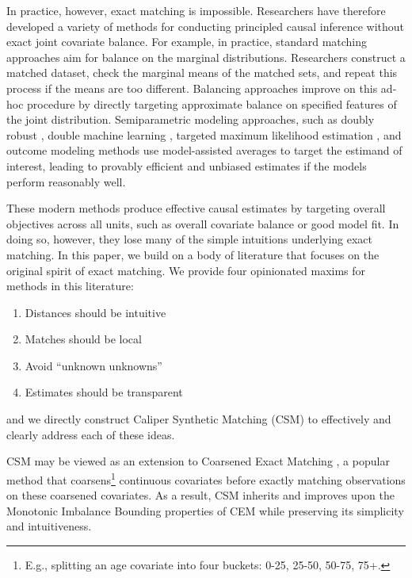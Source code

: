 \documentclass{article}
\begin{document}
In practice, however, exact matching is impossible.
Researchers have therefore developed a variety of methods for conducting principled causal inference without exact joint covariate balance.
For example, in practice, standard matching approaches aim for balance on the marginal distributions.
Researchers construct a matched dataset, check the marginal means of the matched sets, and repeat this process if the means are too different.
Balancing approaches \citep[e.g., ][]{hainmueller2012entropy, zubizarreta2015stable, ben2021balancing} improve on this ad-hoc procedure by directly targeting approximate balance on specified features of the joint distribution.
Semiparametric modeling approaches, such as doubly robust \citep{robins1994estimation, rotnitzky1998semiparametric}, double machine learning \citep{chernozhukov2018dml}, targeted maximum likelihood estimation \citep{van2006targeted}, and outcome modeling methods \citep[e.g., ][]{hill2011bayesian} use model-assisted averages to target the estimand of interest, leading to provably efficient and unbiased estimates if the models perform reasonably well.

These modern methods produce effective causal estimates by targeting overall objectives across all units, such as overall covariate balance or good model fit.
In doing so, however, they lose many of the simple intuitions underlying exact matching.
In this paper, we build on a body of literature that focuses on the original spirit of exact matching.
We provide four opinionated maxims for methods in this literature: 
\begin{enumerate}[itemsep=0pt, topsep=12pt, partopsep=0pt]
    \item Distances should be intuitive
    \item Matches should be local
    \item Avoid ``unknown unknowns''
    \item Estimates should be transparent
\end{enumerate}
and we directly construct Caliper Synthetic Matching (CSM) to effectively and clearly address each of these ideas.

CSM may be viewed as an extension to Coarsened Exact Matching \citep[CEM; ][]{iacus2012causal}, a popular method that coarsens\footnote{E.g., splitting an age covariate into four buckets: 0-25, 25-50, 50-75, 75+.} continuous covariates before exactly matching observations on these coarsened covariates.
As a result, CSM inherits and improves upon the Monotonic Imbalance Bounding \citep[MIB; ][]{iacus2011multivariate} properties of CEM while preserving its simplicity and intuitiveness.
\end{document}
